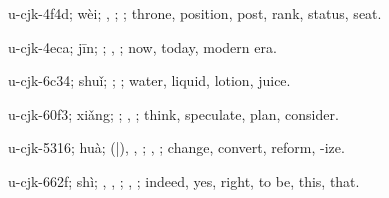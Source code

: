 \begin{multicols}{2}
{\cjkgGlue{}u-cjk-4f4d; wèi; \cjkgGlue{}, \cjkgGlue{}; \cjkgGlue{}; throne, position, post, rank, status, seat.

\cjkgGlue{}u-cjk-4eca; jīn; \cjkgGlue{}; \cjkgGlue{}, \cjkgGlue{}; now, today, modern era.

\cjkgGlue{}u-cjk-6c34; shuǐ; \cjkgGlue{}; \cjkgGlue{}; water, liquid, lotion, juice.

\cjkgGlue{}u-cjk-60f3; xiǎng; \cjkgGlue{}\cjkgGlue{}\cjkgGlue{}; \cjkgGlue{}, \cjkgGlue{}; think, speculate, plan, consider.

\cjkgGlue{}u-cjk-5316; huà; \cjkgGlue{}\cjkgGlue{}(\cjkgGlue{}|\cjkgGlue{}), \cjkgGlue{}\cjkgGlue{}\cjkgGlue{}, \cjkgGlue{}\cjkgGlue{}\cjkgGlue{}; \cjkgGlue{}, \cjkgGlue{}; change, convert, reform, -ize.

\cjkgGlue{}u-cjk-662f; shì; \cjkgGlue{}, \cjkgGlue{}, \cjkgGlue{}; \cjkgGlue{}, \cjkgGlue{}; indeed, yes, right, to be, this, that.

}
\end{multicols}
